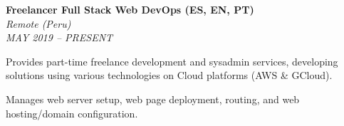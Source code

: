 \item \label{job:freelance}
\textbf{Freelancer Full Stack Web DevOps (ES, EN, PT)} \\
\textit{Remote (Peru)} \\
\textit{MAY 2019 -- PRESENT}
\resumeItemListStart
    \item Provides part-time freelance development and sysadmin services, developing solutions using various technologies on Cloud platforms (AWS \& GCloud).
    \item Manages web server setup, web page deployment, routing, and web hosting/domain configuration.
\resumeItemListEnd
